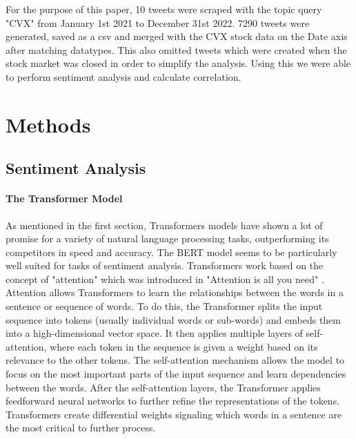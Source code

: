 \documentclass[12pt, letterpaper, titlepage]{article}
\begin{document}
For the purpose of this paper, 10 tweets were scraped with the topic query "CVX" from January 1st 2021 to December 31st 2022.  7290 tweets were generated, saved as a csv and merged with the CVX stock data on the Date axis after matching datatypes. This also omitted tweets which were created when the stock market was closed in order to simplify the analysis. Using this we were able to perform sentiment analysis and calculate correlation.


\label{sec: methods}
\section{Methods}

\subsection{Sentiment Analysis}
\paragraph{The Transformer Model}
As mentioned in the first section, Transformers models have shown a lot of promise for a variety of natural language processing tasks, outperforming its competitors in speed and accuracy. The BERT model seems to be particularly well suited for tasks of sentiment analysis. Transformers work based on the concept of "attention" which was introduced in "Attention is all you need" \citep{vaswani2017attention} . Attention allows Transformers to learn the relationships between the words in a sentence or sequence of words. To do this, the Transformer splits the input sequence into tokens (usually individual words or sub-words) and embeds them into a high-dimensional vector space. It then applies multiple layers of self-attention, where each token in the sequence is given a weight based on its relevance to the other tokens. The self-attention mechanism allows the model to focus on the most important parts of the input sequence and learn dependencies between the words. After the self-attention layers, the Transformer applies feedforward neural networks to further refine the representations of the tokens. Transformers create differential weights signaling which words in a sentence are the most critical to further process. 	
\end{document}
